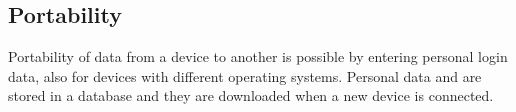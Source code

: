 \documentclass[../../../RASD.tex]{subfiles}
\begin{document}
\subsection{Portability\label{sect:3.5.5}}

Portability of  data from a device to another is possible by entering personal login data, also for devices with different operating systems. Personal data and  are stored in a database and they are downloaded when a new device is connected. 
\end{document}
